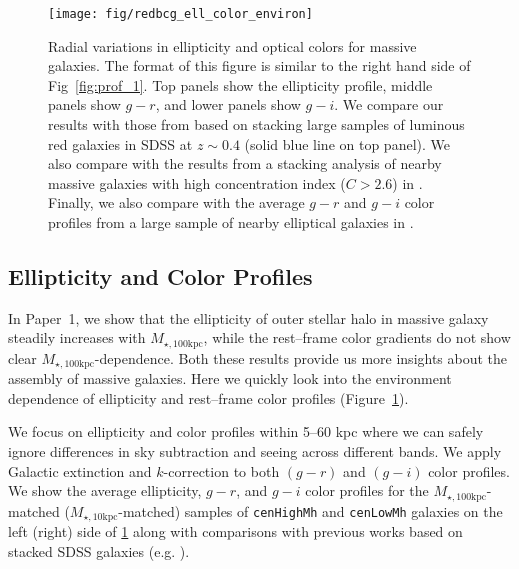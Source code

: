 \documentclass[a4paper,fleqn,usenatbib]{mnras}
\def\rbcg{\texttt{cenHighMh}}
\def\nbcg{\texttt{cenLowMh}}
\def\minn{{$M_{\star,10\mathrm{kpc}}$}}
\def\mtot{{$M_{\star,100\mathrm{kpc}}$}}
\begin{document}
  \begin{figure}
      \centering 
      \texttt{[image: fig/redbcg\_ell\_color\_environ]}
      \caption{
          Radial variations in ellipticity and optical colors for massive galaxies. 
          The format of this figure is similar to the right hand side of 
          Fig~\ref{fig:prof_1}. 
          Top panels show the ellipticity profile, middle panels show $g-r$, and lower 
          panels show $g-i$. 
          We compare our results with those from \citet{Tal2011} based on stacking 
          large samples of luminous red galaxies in SDSS at $z{\sim} 0.4$ 
          (solid blue line on top panel). 
          We also compare with the results from a stacking analysis of nearby massive 
          galaxies with high concentration index ($C>2.6$) in 
          \citet[][blue dash lines on the top and middle panels]{DSouza2014}. 
          Finally, we also compare with the average $g-r$ and $g-i$ color profiles 
          from a large sample of nearby elliptical galaxies in \citet[][blue, solid 
          lines on the middle and bottom panels]{LaBarbera2010}.
          }
      \label{fig:ell_color}
  \end{figure}


\subsection{Ellipticity and Color Profiles}
    \label{ssec:ell_color}
    
    In Paper~1, we show that the ellipticity of outer stellar halo in massive galaxy 
    steadily increases with \mtot{}, while the rest--frame color gradients do not show 
    clear \mtot{}-dependence. 
    Both these results provide us more insights about the assembly of massive galaxies. 
    Here we quickly look into the environment dependence of ellipticity and 
    rest--frame color profiles (Figure~\ref{fig:ell_color}). 
    
    We focus on ellipticity and color profiles within 5--60 kpc where we can safely 
    ignore differences in sky subtraction and seeing across different bands. 
    We apply Galactic extinction and $k$-correction to both $(g-r)$ and $(g-i)$ color 
    profiles.
    We show the average ellipticity, $g-r$, and $g-i$ color profiles for the 
    \mtot{}-matched (\minn{}-matched) samples of \rbcg{} and \nbcg{} galaxies on the 
    left (right) side of \ref{fig:ell_color} along with comparisons with previous 
    works based on stacked SDSS galaxies 
    (e.g. \citealt{LaBarbera2010, Tal2011, DSouza2014}).
    
\end{document}
